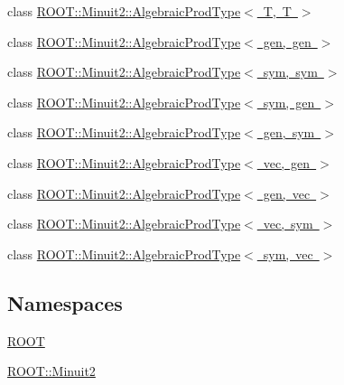 \begin{DoxyCompactItemize}
\item 
class \mbox{\hyperlink{classROOT_1_1Minuit2_1_1AlgebraicProdType_3_01T_00_01T_01_4}{R\+O\+O\+T\+::\+Minuit2\+::\+Algebraic\+Prod\+Type$<$ T, T $>$}}
\item 
class \mbox{\hyperlink{classROOT_1_1Minuit2_1_1AlgebraicProdType_3_01gen_00_01gen_01_4}{R\+O\+O\+T\+::\+Minuit2\+::\+Algebraic\+Prod\+Type$<$ gen, gen $>$}}
\item 
class \mbox{\hyperlink{classROOT_1_1Minuit2_1_1AlgebraicProdType_3_01sym_00_01sym_01_4}{R\+O\+O\+T\+::\+Minuit2\+::\+Algebraic\+Prod\+Type$<$ sym, sym $>$}}
\item 
class \mbox{\hyperlink{classROOT_1_1Minuit2_1_1AlgebraicProdType_3_01sym_00_01gen_01_4}{R\+O\+O\+T\+::\+Minuit2\+::\+Algebraic\+Prod\+Type$<$ sym, gen $>$}}
\item 
class \mbox{\hyperlink{classROOT_1_1Minuit2_1_1AlgebraicProdType_3_01gen_00_01sym_01_4}{R\+O\+O\+T\+::\+Minuit2\+::\+Algebraic\+Prod\+Type$<$ gen, sym $>$}}
\item 
class \mbox{\hyperlink{classROOT_1_1Minuit2_1_1AlgebraicProdType_3_01vec_00_01gen_01_4}{R\+O\+O\+T\+::\+Minuit2\+::\+Algebraic\+Prod\+Type$<$ vec, gen $>$}}
\item 
class \mbox{\hyperlink{classROOT_1_1Minuit2_1_1AlgebraicProdType_3_01gen_00_01vec_01_4}{R\+O\+O\+T\+::\+Minuit2\+::\+Algebraic\+Prod\+Type$<$ gen, vec $>$}}
\item 
class \mbox{\hyperlink{classROOT_1_1Minuit2_1_1AlgebraicProdType_3_01vec_00_01sym_01_4}{R\+O\+O\+T\+::\+Minuit2\+::\+Algebraic\+Prod\+Type$<$ vec, sym $>$}}
\item 
class \mbox{\hyperlink{classROOT_1_1Minuit2_1_1AlgebraicProdType_3_01sym_00_01vec_01_4}{R\+O\+O\+T\+::\+Minuit2\+::\+Algebraic\+Prod\+Type$<$ sym, vec $>$}}
\end{DoxyCompactItemize}
\subsection*{Namespaces}
\begin{DoxyCompactItemize}
\item 
 \mbox{\hyperlink{namespaceROOT}{R\+O\+OT}}
\item 
 \mbox{\hyperlink{namespaceROOT_1_1Minuit2}{R\+O\+O\+T\+::\+Minuit2}}
\end{DoxyCompactItemize}
